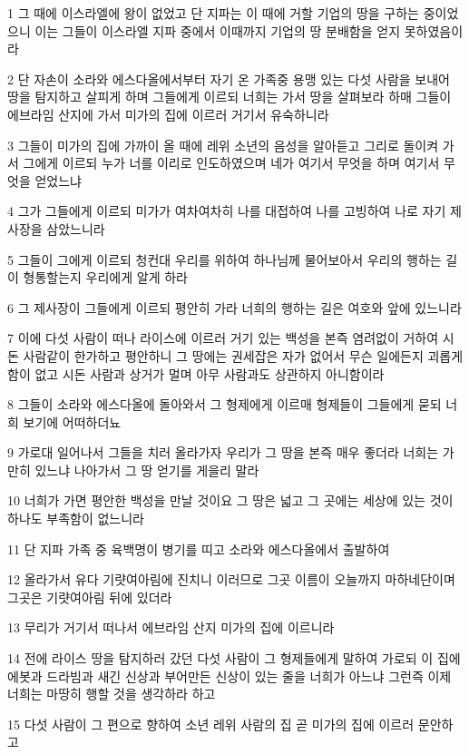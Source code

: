 \par 1 그 때에 이스라엘에 왕이 없었고 단 지파는 이 때에 거할 기업의 땅을 구하는 중이었으니 이는 그들이 이스라엘 지파 중에서 이때까지 기업의 땅 분배함을 얻지 못하였음이라
\par 2 단 자손이 소라와 에스다올에서부터 자기 온 가족중 용맹 있는 다섯 사람을 보내어 땅을 탐지하고 살피게 하며 그들에게 이르되 너희는 가서 땅을 살펴보라 하매 그들이 에브라임 산지에 가서 미가의 집에 이르러 거기서 유숙하니라
\par 3 그들이 미가의 집에 가까이 올 때에 레위 소년의 음성을 알아듣고 그리로 돌이켜 가서 그에게 이르되 누가 너를 이리로 인도하였으며 네가 여기서 무엇을 하며 여기서 무엇을 얻었느냐
\par 4 그가 그들에게 이르되 미가가 여차여차히 나를 대접하여 나를 고빙하여 나로 자기 제사장을 삼았느니라
\par 5 그들이 그에게 이르되 청컨대 우리를 위하여 하나님께 물어보아서 우리의 행하는 길이 형통할는지 우리에게 알게 하라
\par 6 그 제사장이 그들에게 이르되 평안히 가라 너희의 행하는 길은 여호와 앞에 있느니라
\par 7 이에 다섯 사람이 떠나 라이스에 이르러 거기 있는 백성을 본즉 염려없이 거하여 시돈 사람같이 한가하고 평안하니 그 땅에는 권세잡은 자가 없어서 무슨 일에든지 괴롭게 함이 없고 시돈 사람과 상거가 멀며 아무 사람과도 상관하지 아니함이라
\par 8 그들이 소라와 에스다올에 돌아와서 그 형제에게 이르매 형제들이 그들에게 묻되 너희 보기에 어떠하더뇨
\par 9 가로대 일어나서 그들을 치러 올라가자 우리가 그 땅을 본즉 매우 좋더라 너희는 가만히 있느냐 나아가서 그 땅 얻기를 게을리 말라
\par 10 너희가 가면 평안한 백성을 만날 것이요 그 땅은 넓고 그 곳에는 세상에 있는 것이 하나도 부족함이 없느니라
\par 11 단 지파 가족 중 육백명이 병기를 띠고 소라와 에스다올에서 출발하여
\par 12 올라가서 유다 기럇여아림에 진치니 이러므로 그곳 이름이 오늘까지 마하네단이며 그곳은 기럇여아림 뒤에 있더라
\par 13 무리가 거기서 떠나서 에브라임 산지 미가의 집에 이르니라
\par 14 전에 라이스 땅을 탐지하러 갔던 다섯 사람이 그 형제들에게 말하여 가로되 이 집에 에봇과 드라빔과 새긴 신상과 부어만든 신상이 있는 줄을 너희가 아느냐 그런즉 이제 너희는 마땅히 행할 것을 생각하라 하고
\par 15 다섯 사람이 그 편으로 향하여 소년 레위 사람의 집 곧 미가의 집에 이르러 문안하고
